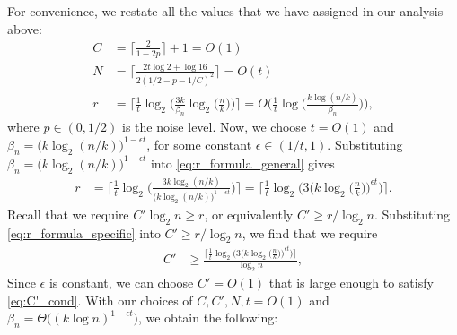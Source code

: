 For convenience, we restate all the values that we have assigned in our analysis above:
\begin{align}
    C&=\bigg\lceil\frac{2}{1-2p}\bigg\rceil+1=O(1) \\
    N&=\bigg\lceil\frac{2t\log2+\log16}{2(1/2-p-1/C)^2}\bigg\rceil=O(t) \\
    r&=\bigg\lceil\frac{1}{t}\log_2\bigg(\frac{3k}{\beta_n}\log_2\Big(\frac{n}{k}\Big)\bigg)\bigg\rceil
    =O\bigg(\frac{1}{t}\log\Big(\frac{k\log(n/k)}{\beta_n}\Big)\bigg), \label{eq:r_formula_general}
\end{align}
where $p\in(0,1/2)$ is the noise level. Now, we choose $t=O(1)$ and $\beta_n=\big(k\log_2(n/k)\big)^{1-\epsilon t}$, for some constant $\epsilon\in(1/t,1)$. Substituting $\beta_n=\big(k\log_2(n/k)\big)^{1-\epsilon t}$ into \eqref{eq:r_formula_general} gives
\begin{align}
    r&=\bigg\lceil\frac{1}{t}\log_2\bigg(\frac{3k\log_2(n/k)}{\big(k\log_2(n/k)\big)^{1-\epsilon t}}\bigg)\bigg\rceil
    =\bigg\lceil\frac{1}{t}\log_2\bigg(3\Big(k\log_2\Big(\frac{n}{k}\Big)\Big)^{\epsilon t}\bigg)\bigg\rceil. \label{eq:r_formula_specific}
\end{align}
Recall that we require $C' \log_2n \geq r$, or equivalently $C'\geq r/\log_2n$. Substituting \eqref{eq:r_formula_specific} into $C'\geq r/\log_2n$, we find that we require
\begin{align}
    C'&\geq\frac{\big\lceil\frac{1}{t}\log_2\big(3\big(k\log_2\big(\frac{n}{k}\big)\big)^{\epsilon t}\big)\big\rceil}{\log_2n}, \label{eq:C'_cond}
\end{align}
Since $\epsilon$ is constant, we can choose $C'=O(1)$ that is large enough to satisfy \eqref{eq:C'_cond}. With our choices of $C,C',N,t=O(1)$ and $\beta_n=\Theta\big((k\log n)^{1-\epsilon t}\big)$, we obtain the following:

